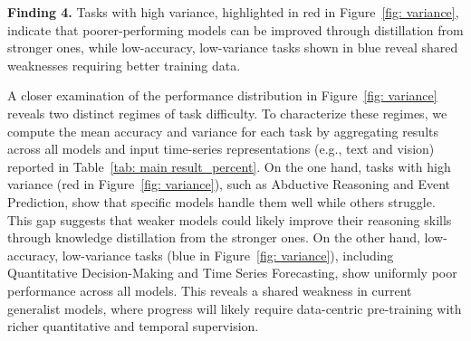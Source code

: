 \documentclass{article}
\theoremstyle{plain}
\theoremstyle{definition}
\theoremstyle{remark}
\theoremstyle{plain}
\begin{document}
\begin{table}[t]
\caption{
Performance changes of models with tool augmentation. $\Delta$ indicates the performance difference after enabling tool-augmented reasoning.
}
\centering
{}
\label{tab: tool}
\end{table}

\begin{tcolorbox}
    \textbf{Finding 4. } 
    Tasks with high variance, highlighted in red in Figure~\ref{fig: variance}, indicate that poorer-performing models can be improved through distillation from stronger ones, while low-accuracy, low-variance tasks shown in blue reveal shared weaknesses requiring better training data.
\end{tcolorbox}

A closer examination of the performance distribution in Figure~\ref{fig: variance} reveals two distinct regimes of task difficulty. To characterize these regimes, we compute the mean accuracy and variance for each task by aggregating results across all models and input time-series representations (e.g., text and vision) reported in Table~\ref{tab: main result_percent}.
On the one hand, tasks with high variance (red in Figure~\ref{fig: variance}), such as Abductive Reasoning and Event Prediction, show that specific models handle them well while others struggle. This gap suggests that weaker models could likely improve their reasoning skills through knowledge distillation from the stronger ones. 
On the other hand, low-accuracy, low-variance tasks (blue in Figure~\ref{fig: variance}), including Quantitative Decision-Making and Time Series Forecasting, show uniformly poor performance across all models. This reveals a shared weakness in current generalist models, where progress will likely require data-centric pre-training with richer quantitative and temporal supervision.
\end{document}
